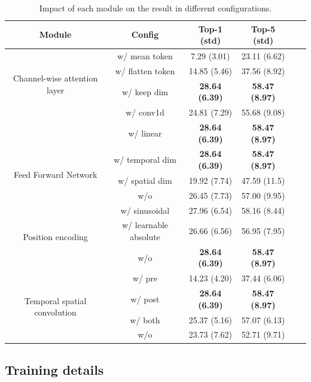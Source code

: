 \documentclass{article}
\begin{document}
\begin{table}[h]
\centering
\caption{Impact of each module on the result in different configurations.}
\label{tab:module_performance}
\begin{tabular}{cccccc}
\toprule
\textbf{Module} & \textbf{Config} & \textbf{Top-1 (std)} & \textbf{Top-5 (std)} \\
\midrule
\multirow{4}{*}{Channel-wise attention layer}
 & w/ mean token & 7.29 (3.01)& 23.11 (6.62)\\
 & w/ flatten token & 14.85 (5.46)& 37.56 (8.92)\\
 & w/ keep dim  & \textbf{28.64 (6.39)}& \textbf{58.47 (8.97)}\\
\midrule
\multirow{2}{*}{Token embedding} & w/ conv1d & 24.81 (7.29)& 55.68 (9.08)\\
 & w/ linear  & \textbf{28.64 (6.39)}& \textbf{58.47 (8.97)}\\
\midrule
\multirow{3}{*}{Feed Forward Network} & w/ temporal dim & \textbf{28.64 (6.39)}& \textbf{58.47 (8.97)}\\
 & w/ spatial dim & 19.92 (7.74) &  47.59 (11.5)\\ 
 & w/o   & 26.45 (7.73) & 57.00 (9.95)\\ 
\midrule
\multirow{3}{*}{Position encoding} & w/ sinusoidal & 27.96 (6.54)& 58.16 (8.44)\\
 & w/ learnable absolute & 26.66 (6.56)& 56.95 (7.95)\\
& w/o   & \textbf{28.64 (6.39)}& \textbf{58.47 (8.97)}\\
\midrule
 \multirow{4}{*}{Temporal spatial convolution} & w/ pre & 14.23 (4.20)& 37.44 (6.06)\\
 & w/ post & \textbf{28.64 (6.39)} & \textbf{58.47 (8.97)}\\
 & w/ both & 25.37 (5.16) & 57.07 (6.13)\\
 & w/o   & 23.73 (7.62) & 52.71 (9.71)\\ 
\bottomrule
\end{tabular}
\end{table}



\subsection{Training details}
\end{document}
